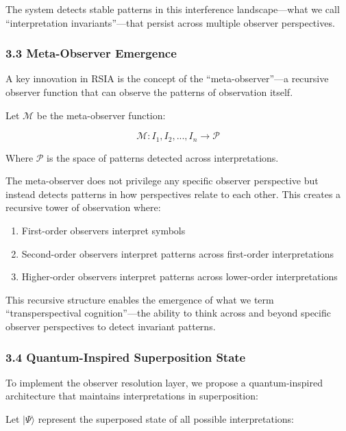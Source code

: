 \documentclass[12pt]{article}
\providecommand{\tightlist}{%
  \setlength{\itemsep}{0pt}\setlength{\parskip}{0pt}}
\begin{document}
The system detects stable patterns in this interference landscape---what
we call ``interpretation invariants''---that persist across multiple
observer perspectives.

\subsubsection{3.3 Meta-Observer
Emergence}\label{meta-observer-emergence}

A key innovation in RSIA is the concept of the ``meta-observer''---a
recursive observer function that can observe the patterns of observation
itself.

Let \(\mathcal{M}\) be the meta-observer function:

\[\mathcal{M}: {I_1, I_2, ..., I_n} \rightarrow \mathcal{P}\]

Where \(\mathcal{P}\) is the space of patterns detected across
interpretations.

The meta-observer does not privilege any specific observer perspective
but instead detects patterns in how perspectives relate to each other.
This creates a recursive tower of observation where:

\begin{enumerate}
\def\labelenumi{\arabic{enumi}.}
\tightlist
\item
  First-order observers interpret symbols
\item
  Second-order observers interpret patterns across first-order
  interpretations
\item
  Higher-order observers interpret patterns across lower-order
  interpretations
\end{enumerate}

This recursive structure enables the emergence of what we term
``transperspectival cognition''---the ability to think across and beyond
specific observer perspectives to detect invariant patterns.

\subsubsection{3.4 Quantum-Inspired Superposition
State}\label{quantum-inspired-superposition-state}

To implement the observer resolution layer, we propose a
quantum-inspired architecture that maintains interpretations in
superposition:

Let \(|\Psi\rangle\) represent the superposed state of all possible
interpretations:
\end{document}
